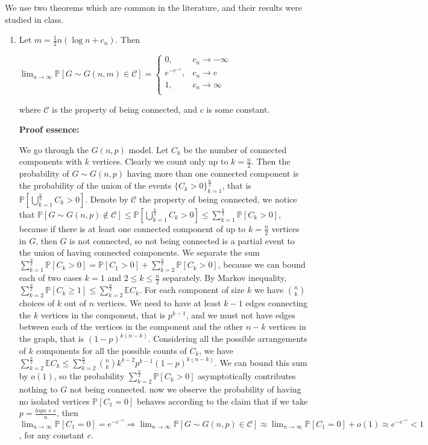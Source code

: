 \documentclass{article}
\begin{document}
We use two theorems which are common in the literature, and their results were studied in class.
\begin{enumerate}
    \item Let $m=\frac{1}{2}n(\log{n}+c_n)$. Then

    $\lim_{n\rightarrow\infty}\mathbb{P}[G\sim{G(n,m)}\in\mathcal{C}]=\begin{cases}
        0, & c_n\rightarrow{-\infty} \\
        e^{-e^{-c}}, & c_n\rightarrow{c} \\
        1, & c_n\rightarrow\infty \\
    \end{cases}$

    where $\mathcal{C}$ is the property of being connected, and $c$ is some constant.

    \textbf{Proof essence:}

    We go through the $G(n,p)$ model.
Let $C_k$ be the number of connected components with $k$ vertices. Clearly we count only up to $k=\frac{n}{2}$. Then the probability of $G\sim{G(n,p)}$ having more than one connected component is the probability of the union of the events $\{C_k>0\}_{k=1}^\frac{n}{2}$, that is $\mathbb{P}[\bigcup_{k=1}^\frac{n}{2}C_k>0]$. Denote by $\mathcal{C}$ the property of being connected, we notice that $\mathbb{P}[G\sim{G(n,p)}\notin\mathcal{C}]\leq\mathbb{P}[\bigcup_{k=1}^\frac{n}{2}C_k>0]\leq\sum_{k=1}^\frac{n}{2}\mathbb{P}[C_k>0]$, because if there is at least one connected component of up to $k=\frac{n}{2}$ vertices in $G$, then $G$ is not connected, so not being connected is a partial event to the union of having connected components. We separate the sum $\sum_{k=1}^\frac{n}{2}\mathbb{P}[C_k>0]=\mathbb{P}[C_1>0]+\sum_{k=2}^\frac{n}{2}\mathbb{P}[C_k>0]$, because we can bound each of two cases $k=1$ and $2\leq{k}\leq\frac{n}{2}$ separately. By Markov inequality, $\sum_{k=2}^\frac{n}{2}\mathbb{P}[C_k\geq{1}]\leq\sum_{k=2}^\frac{n}{2}\mathbb{E}C_k$. For each component of size $k$ we have $\binom{n}{k}$ choices of $k$ out of $n$ vertices. We need to have at least $k-1$ edges connecting the $k$ vertices in the component, that is $p^{k-1}$, and we must not have edges between each of the vertices in the component and the other $n-k$ vertices in the graph, that is $(1-p)^{k(n-k)}$. Considering all the possible arrangements of $k$ components for all the possible counts of $C_k$, we have $\sum_{k=2}^\frac{n}{2}\mathbb{E}C_k\leq\sum_{k=2}^\frac{n}{2}\binom{n}{k}k^{k-2}p^{k-1}(1-p)^{k(n-k)}$. We can bound this sum by $o(1)$, so the probability $\sum_{k=2}^\frac{n}{2}\mathbb{P}[C_k>0]$ asymptotically contributes nothing to $G$ not being connected. now we observe the probability of having no isolated vertices $\mathbb{P}[C_1=0]$ behaves according to the claim that if we take $p=\frac{log{n}+c}{n}$, then $\lim_{n\rightarrow\infty}\mathbb{P}[C_1=0]=e^{-e^{-c}}\Rightarrow\lim_{n\rightarrow\infty}\mathbb{P}[G\sim{G(n,p)}\in\mathcal{C}]\approx\lim_{n\rightarrow\infty}\mathbb{P}[C_1=0]+o(1)\approx{e^{-e^{-c}}}<1$, for any constant $c$.


\end{enumerate}
\end{document}
